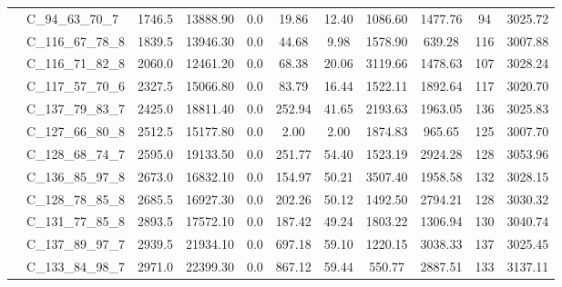 \documentclass{article}
\begin{document}
\begin{table}[!h]
{\begin{tabular}{llccccccccc}
                  & C\_94\_63\_70\_7 &         1746.5 &    13888.90 &  0.0 &              19.86 &             12.40 &        1086.60 &       1477.76 &          94 &  3025.72 \\
                  & C\_116\_67\_78\_8 &         1839.5 &    13946.30 &  0.0 &              44.68 &              9.98 &        1578.90 &        639.28 &         116 &  3007.88 \\
                  & C\_116\_71\_82\_8 &         2060.0 &    12461.20 &  0.0 &              68.38 &             20.06 &        3119.66 &       1478.63 &         107 &  3028.24 \\
                  & C\_117\_57\_70\_6 &         2327.5 &    15066.80 &  0.0 &              83.79 &             16.44 &        1522.11 &       1892.64 &         117 &  3020.70 \\
                  & C\_137\_79\_83\_7 &         2425.0 &    18811.40 &  0.0 &             252.94 &             41.65 &        2193.63 &       1963.05 &         136 &  3025.83 \\
                  & C\_127\_66\_80\_8 &         2512.5 &    15177.80 &  0.0 &               2.00 &              2.00 &        1874.83 &        965.65 &         125 &  3007.70 \\
                  & C\_128\_68\_74\_7 &         2595.0 &    19133.50 &  0.0 &             251.77 &             54.40 &        1523.19 &       2924.28 &         128 &  3053.96 \\
                  & C\_136\_85\_97\_8 &         2673.0 &    16832.10 &  0.0 &             154.97 &             50.21 &        3507.40 &       1958.58 &         132 &  3028.15 \\
                  & C\_128\_78\_85\_8 &         2685.5 &    16927.30 &  0.0 &             202.26 &             50.12 &        1492.50 &       2794.21 &         128 &  3030.32 \\
                  & C\_131\_77\_85\_8 &         2893.5 &    17572.10 &  0.0 &             187.42 &             49.24 &        1803.22 &       1306.94 &         130 &  3040.74 \\
                  & C\_137\_89\_97\_7 &         2939.5 &    21934.10 &  0.0 &             697.18 &             59.10 &        1220.15 &       3038.33 &         137 &  3025.45 \\
                  & C\_133\_84\_98\_7 &         2971.0 &    22399.30 &  0.0 &             867.12 &             59.44 &         550.77 &       2887.51 &         133 &  3137.11 \\

\end{tabular}}
\end{table}
\end{document}
